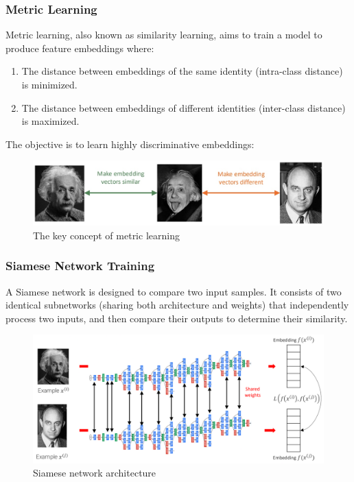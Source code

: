 \subsubsection{Metric Learning}
Metric learning, also known as similarity learning, aims to train a model to produce feature embeddings where:

\begin{enumerate}
  \item The distance between embeddings of the same identity (intra-class distance) is minimized.
  \item The distance between embeddings of different identities (inter-class distance) is maximized.
\end{enumerate}

The objective is to learn highly discriminative embeddings:

\begin{figure}[htbp]
  \centering
  \includegraphics[width=0.7\linewidth]{./img/metric_learning.jpg}
  \caption{The key concept of metric learning}
\end{figure}

\subsubsection{Siamese Network Training}
A Siamese network is designed to compare two input samples. It consists of two identical subnetworks (sharing both architecture and weights) that independently process two inputs, and then compare their outputs to determine their similarity.

\begin{figure}[htbp]
  \centering
  \includegraphics[width=0.7\linewidth]{./img/siamese_network.png}
  \caption{Siamese network architecture}
\end{figure}

